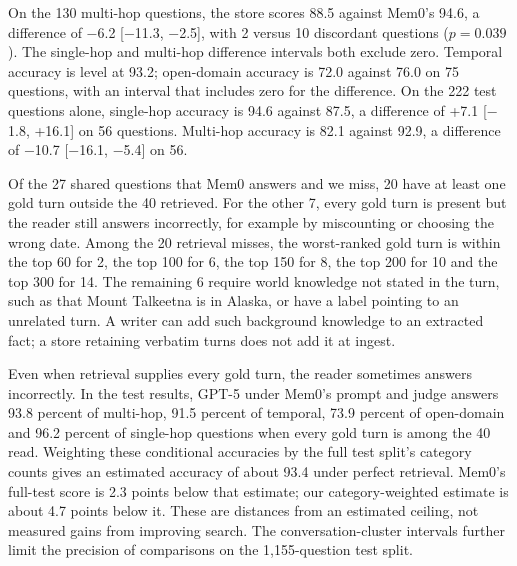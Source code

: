 On the 130 multi-hop questions, the store scores 88.5 against Mem0's 94.6, a difference of $-$6.2 [$-$11.3, $-$2.5], with 2 versus 10 discordant questions ($p = 0.039$). The single-hop and multi-hop difference intervals both exclude zero. Temporal accuracy is level at 93.2; open-domain accuracy is 72.0 against 76.0 on 75 questions, with an interval that includes zero for the difference. On the 222 test questions alone, single-hop accuracy is 94.6 against 87.5, a difference of +7.1 [$-$1.8, +16.1] on 56 questions. Multi-hop accuracy is 82.1 against 92.9, a difference of $-$10.7 [$-$16.1, $-$5.4] on 56.

Of the 27 shared questions that Mem0 answers and we miss, 20 have at least one gold turn outside the 40 retrieved. For the other 7, every gold turn is present but the reader still answers incorrectly, for example by miscounting or choosing the wrong date. Among the 20 retrieval misses, the worst-ranked gold turn is within the top 60 for 2, the top 100 for 6, the top 150 for 8, the top 200 for 10 and the top 300 for 14. The remaining 6 require world knowledge not stated in the turn, such as that Mount Talkeetna is in Alaska, or have a label pointing to an unrelated turn. A writer can add such background knowledge to an extracted fact; a store retaining verbatim turns does not add it at ingest.

Even when retrieval supplies every gold turn, the reader sometimes answers incorrectly. In the test results, GPT-5 under Mem0's prompt and judge answers 93.8 percent of multi-hop, 91.5 percent of temporal, 73.9 percent of open-domain and 96.2 percent of single-hop questions when every gold turn is among the 40 read. Weighting these conditional accuracies by the full test split's category counts gives an estimated accuracy of about 93.4 under perfect retrieval. Mem0's full-test score is 2.3 points below that estimate; our category-weighted estimate is about 4.7 points below it. These are distances from an estimated ceiling, not measured gains from improving search. The conversation-cluster intervals further limit the precision of comparisons on the 1,155-question test split.

